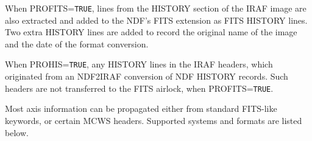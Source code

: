 {{{         \sstitem
         When PROFITS={\tt TRUE}, lines from the HISTORY section of the IRAF
         image are also extracted and added to the NDF's FITS extension as
         FITS HISTORY lines.  Two extra HISTORY lines are added to record
         the original name of the image and the date of the format
         conversion.

         \sstitem
         When PROHIS={\tt TRUE}, any HISTORY lines in the IRAF headers, which
         originated from an NDF2IRAF conversion of NDF HISTORY records.
         Such headers are not transferred to the FITS airlock, when
         PROFITS={\tt TRUE}.

         \sstitem
         Most axis information can be propagated either from standard
         FITS-like keywords, or certain MCWS headers.  Supported systems
         and formats are listed below.


}}}

